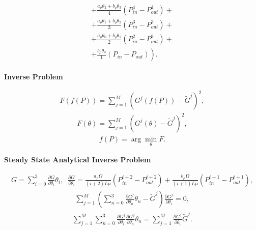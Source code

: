 \documentclass[a4paper,12pt]{extreport}
\begin{document}
\begin{multicols}{2}
\begin{eqnarray}
\begin{gathered}
                +\frac{a_{\rho}\theta_{2} + b_{\rho}\theta_{3}}{4} \left(P_{in}^4 -P_{out}^4 \right) +\\
                +\frac{ a_{\rho}\theta_{1} +  b_{\rho}\theta_{2}}{3} \left(P_{in}^3 -P_{out}^3 \right) +\\
                +\frac{ a_{\rho}\theta_{0} + b_{\rho}\theta_{1}}{2} \left(P_{in}^2 -P_{out}^2 \right) + \\
                \left.+\frac{ b_{\rho}\theta_{0}}{1} \left(P_{in} -P_{out} \right)\right).
            \end{gathered}
        \end{eqnarray}

        \columnbreak

        \begin{center}
        {\large \textbf{Inverse Problem}}
        \end{center}
        \begin{eqnarray}
            \label{eq:functional}
            F\left(f\left(P\right)\right) =\sum_{j=1}^M \left(G^j\left(f\left(P\right)\right) - \tilde{G}^j\right)^2,
        \end{eqnarray}
        \begin{eqnarray}
            \label{eq:functional_parameters}
            F\left(\theta\right) =\sum_{j=1}^M \left(G^j\left(\theta\right) - \tilde{G}^j\right)^2,
        \end{eqnarray}
        \begin{eqnarray}
            \label{eq:minimization_functional_parameters}
            f(P) = \arg  \min_{\theta}  F.
        \end{eqnarray}

    \end{multicols}

    \begin{center}
    {\large \textbf{Steady State Analytical Inverse Problem}}
    \end{center}
    \begin{eqnarray}
        \label{eq:consumption_poisson_diff_particular_d}
        G = \sum \limits_{i=0}^{3} \frac{\partial G}{\partial \theta_i}\theta_i, \;\;
        \frac{\partial G}{\partial \theta_{i}} =
        \frac{a_{\rho}\Omega}{\left(i+2\right) L\mu} \left(P_{in}^{i+2} -P_{out}^{i+2} \right)+
        \frac{b_{\rho}\Omega}{\left(i+1\right)L\mu} \left(P_{in}^{i+1} -P_{out}^{i+1} \right),
    \end{eqnarray}
    \begin{eqnarray}
        \label{eq:least_squares_analytical_1}
        \sum_{j=1}^M \left(\sum_{n=0}^{3} \frac{\partial G^j}{\partial \theta_n}\theta_n - \tilde{G}^j\right)\frac{\partial G^j}{\partial \theta_i} = 0,
    \end{eqnarray}
    \begin{eqnarray}
        \label{eq:least_squares_analytical_2}
        \sum_{j=1}^M \sum_{n=0}^{3} \frac{\partial G^j}{\partial \theta_i} \frac{\partial G^j}{\partial \theta_n}\theta_n =\sum_{j=1}^M \frac{\partial G^j}{\partial \theta_i} \tilde{G}^j.
    \end{eqnarray}
\end{document}
